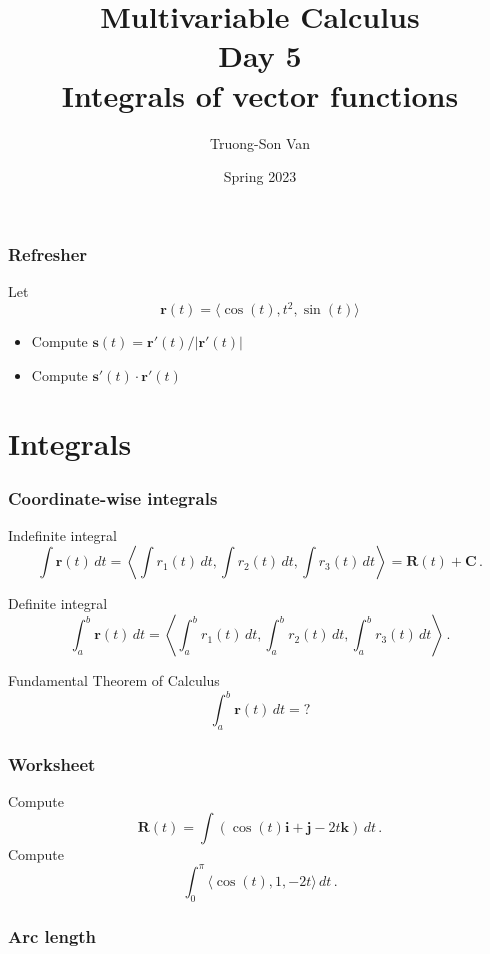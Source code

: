 \documentclass[aspectratio=169]{beamer}
\title{ Multivariable Calculus \\ Day 5 \\ Integrals of vector functions}
\institute{Fulbright University Vietnam}
\author{Truong-Son Van}
\date{Spring 2023}
\newcommand{\vect}{\mathbf}
\begin{document}
\maketitle

\begin{frame}
    \frametitle{Refresher}
    Let 
    $$\vect{r}(t) = \langle \cos(t), t^2, \sin(t) \rangle$$
    \begin{itemize}
        \item Compute $\vect{s}(t)=\vect{r}'(t)/|\vect{r}'(t)|$
        \item Compute $\vect{s}'(t)\cdot \vect{r}'(t)$
    \end{itemize}

\end{frame}


\section{Integrals}

\begin{frame}
    \frametitle{Coordinate-wise integrals}
    Indefinite integral
\begin{equation*}
    \int \vect{r}(t) \, dt = \left\langle \int r_1(t) \, dt, \int r_2(t) \, dt, \int r_3(t) \, dt \right\rangle = \vect{R}(t) + \vect{C} \,. 
\end{equation*}

Definite integral
\begin{equation*}
    \int_a^b \vect{r}(t) \, dt = \left\langle \int_a^b r_1(t) \, dt, \int_a^b r_2(t) \, dt, \int_a^b r_3(t) \, dt \right\rangle \,. 
\end{equation*}

Fundamental Theorem of Calculus
\begin{equation*}
    \int_a^b \vect{r}(t) \, dt =  ?
\end{equation*}
\end{frame}

\begin{frame}
    \frametitle{Worksheet}
    Compute
         $$\vect{R}(t) = \int (\cos(t)\vect{i} + \vect{j} - 2t\vect{k}) \, dt \,.$$
    Compute 
        $$\int_0^\pi \langle \cos(t), 1, -2t  \rangle \, dt \,. $$
\end{frame}



\begin{frame}
    \frametitle{ Arc length}
\end{frame}
\end{document}

